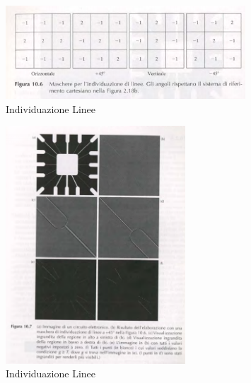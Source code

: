 \documentclass[12pt]{article}
\begin{document}
\begin{figure}[!htb]
    \centering
    \includegraphics[width=0.8\textwidth]{Images/masch.png}
    \caption{Individuazione Linee}
\end{figure}
\FloatBarrier
\begin{figure}[!htb]
    \centering
    \includegraphics[width=0.6\textwidth]{Images/edgemasch.png}
    \caption{Individuazione Linee}
\end{figure}
\FloatBarrier
\newpage
\end{document}

